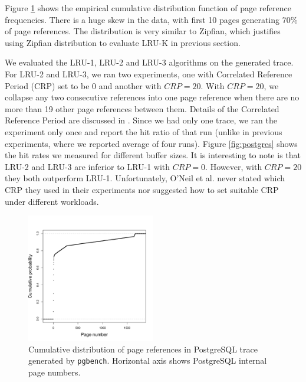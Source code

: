 Figure \ref{fig:references} shows the empirical cumulative distribution function of page reference frequencies. There is a huge skew in the data, with first 10 pages generating 70\% of page references. The distribution is very similar to Zipfian, which justifies using Zipfian distribution to evaluate LRU-K in previous section. 

We evaluated the LRU-1, LRU-2 and LRU-3 algorithms on the generated trace. For LRU-2 and LRU-3, we ran two experiments, one with Correlated Reference Period (CRP) set to be 0 and another with $CRP = 20$. With $CRP = 20$, we collapse any two consecutive references into one page reference when there are no more than 19 other page references between them. Details of the Correlated Reference Period are discussed in \cite{lruk}. Since we had only one trace, we ran the experiment only once and report the hit ratio of that run (unlike in previous experiments, where we reported average of four runs). Figure \ref{fig:postgres} shows the hit rates we measured for different buffer sizes. It is interesting to note is that LRU-2 and LRU-3 are inferior to LRU-1 with $CRP = 0$. However, with $CRP = 20$ they both outperform LRU-1. Unfortunately, O'Neil et al. \cite{lruk} never stated which CRP they used in their experiments nor suggested how to set suitable CRP under different workloads.

\begin{figure}[t!]
    \centering
	\includegraphics[width=0.5\textwidth]{./figures/pages_requested.pdf}
	\caption{Cumulative distribution of page references in PostgreSQL trace generated by \texttt{pgbench}. Horizontal axis shows PostgreSQL internal page numbers.}
	\label{fig:references}
\end{figure}


